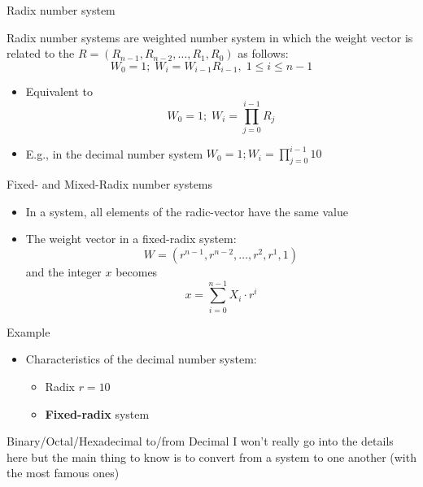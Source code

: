 \begin{parag}{Radix number system}
    \begin{definition}
        Radix number systems are weighted number system in which the weight vector is related to the  $R = (R_{n-1}, R_{n-2}, \dots, R_1, R_0)$ as follows:
        \[W_0 = 1; \; W_i = W_{i-1}R_{i-1}, \; 1 \leq i \leq n-1\]
    \end{definition}
    \begin{itemize}
        \item Equivalent to
        \[W_0 = 1; \; W_i = \prod_{j=0}^{i-1} R_j\]
        \item E.g., in the decimal number system $W_0 = 1; W_i = \prod_{j = 0}^{i-1} 10$
    \end{itemize}
    \begin{subparag}{Fixed- and Mixed-Radix number systems}
        \begin{itemize}
            \item In a  system, all elements of the radic-vector have the same value 
            \item The weight vector in a fixed-radix system:
            \[W = (r^{n-1}, r^{n-2}, \dots, r^2, r^1, 1)\]
            and the integer $x$ becomes 
            \[x = \sum_{i = 0}^{n-1} X_i \cdot r^i\]
        \end{itemize}
    \end{subparag}
    \begin{subparag}{Example}
        \begin{itemize}
            \item Characteristics of the decimal number system:
            \begin{itemize}
                \item Radix $r = 10$
                \item \textbf{Fixed-radix} system
            \end{itemize}
        \end{itemize}
    \end{subparag}
\end{parag}
\begin{parag}{Binary/Octal/Hexadecimal to/from Decimal}
I won't really go into the details here but the main thing to know is to convert from a system to one another (with the most famous ones)
\end{parag}
